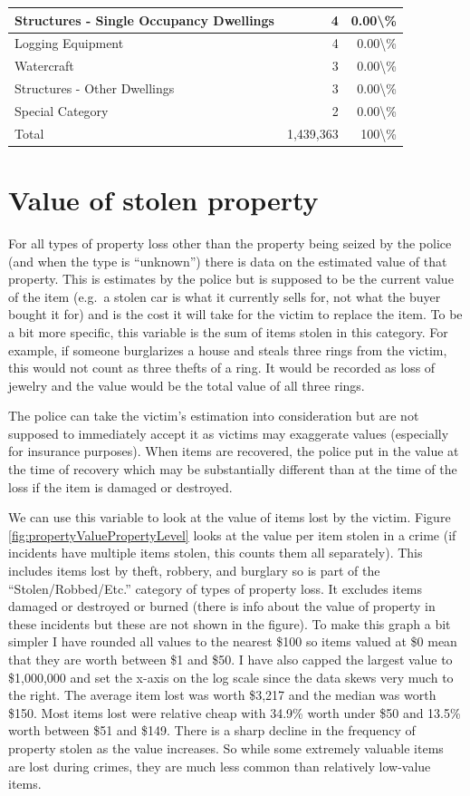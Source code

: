 \documentclass[
]{krantz}
\begin{document}
\begin{longtable}[t]{l|r|r}
\hline
Structures - Single Occupancy Dwellings & 4 & 0.00\textbackslash{}\%\\
\hline
Logging Equipment & 4 & 0.00\textbackslash{}\%\\
\hline
Watercraft & 3 & 0.00\textbackslash{}\%\\
\hline
Structures - Other Dwellings & 3 & 0.00\textbackslash{}\%\\
\hline
Special Category & 2 & 0.00\textbackslash{}\%\\
\hline
Total & 1,439,363 & 100\textbackslash{}\%\\
\hline
\end{longtable}

\section{Value of stolen
property}\label{value-of-stolen-property}

For all types of property loss other than the property being
seized by the police (and when the type is ``unknown'')
there is data on the estimated value of that property. This
is estimates by the police but is supposed to be the current
value of the item (e.g.~a stolen car is what it currently
sells for, not what the buyer bought it for) and is the cost
it will take for the victim to replace the item. To be a bit
more specific, this variable is the sum of items stolen in
this category. For example, if someone burglarizes a house
and steals three rings from the victim, this would not count
as three thefts of a ring. It would be recorded as loss of
jewelry and the value would be the total value of all three
rings.

The police can take the victim's estimation into
consideration but are not supposed to immediately accept it
as victims may exaggerate values (especially for insurance
purposes). When items are recovered, the police put in the
value at the time of recovery which may be substantially
different than at the time of the loss if the item is
damaged or destroyed.

We can use this variable to look at the value of items lost
by the victim. Figure \ref{fig:propertyValuePropertyLevel}
looks at the value per item stolen in a crime (if incidents
have multiple items stolen, this counts them all
separately). This includes items lost by theft, robbery, and
burglary so is part of the ``Stolen/Robbed/Etc.'' category
of types of property loss. It excludes items damaged or
destroyed or burned (there is info about the value of
property in these incidents but these are not shown in the
figure). To make this graph a bit simpler I have rounded all
values to the nearest \$100 so items valued at \$0 mean that
they are worth between \$1 and \$50. I have also capped the
largest value to \$1,000,000 and set the x-axis on the log
scale since the data skews very much to the right. The
average item lost was worth \$3,217 and the median was worth
\$150. Most items lost were relative cheap with 34.9\% worth
under \$50 and 13.5\% worth between \$51 and \$149. There is
a sharp decline in the frequency of property stolen as the
value increases. So while some extremely valuable items are
lost during crimes, they are much less common than
relatively low-value items.
\end{document}
